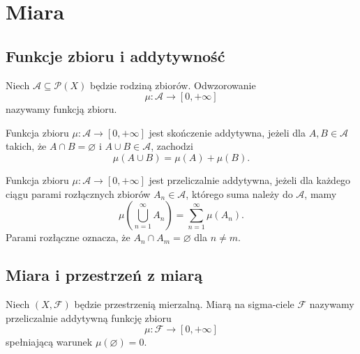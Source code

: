 \chapter{Miara}
\label{chap:miara}

\section{Funkcje zbioru i addytywność}
\label{sec:funkcje-zbioru-addytywnosc}

\begin{definicja}
Niech $\mathcal{A}\subseteq\mathcal{P}(X)$ będzie rodziną zbiorów.
Odwzorowanie
\[
  \mu:\mathcal{A}\longrightarrow[0,+\infty]
\]
nazywamy funkcją zbioru.
\end{definicja}

\begin{definicja}
Funkcja zbioru $\mu:\mathcal{A}\to[0,+\infty]$ jest skończenie
addytywna, jeżeli dla $A,B\in\mathcal{A}$ takich, że
$A\cap B=\varnothing$ i $A\cup B\in\mathcal{A}$, zachodzi
\begin{equation}
  \mu(A\cup B)=\mu(A)+\mu(B).
  \label{eq:skonczona-addytywnosc}
\end{equation}
\end{definicja}

\begin{definicja}
\label{def:przeliczalna-addytywnosc}
Funkcja zbioru $\mu:\mathcal{A}\to[0,+\infty]$ jest przeliczalnie
addytywna, jeżeli dla każdego ciągu parami rozłącznych zbiorów
$A_n\in\mathcal{A}$, którego suma należy do $\mathcal{A}$, mamy
\begin{equation}
  \mu\left(\bigcup_{n=1}^{\infty}A_n\right)
  =\sum_{n=1}^{\infty}\mu(A_n).
  \label{eq:przeliczalna-addytywnosc}
\end{equation}
Parami rozłączne oznacza, że $A_n\cap A_m=\varnothing$ dla $n\neq m$.
\end{definicja}

\section{Miara i przestrzeń z miarą}
\label{sec:miara-przestrzen}

\begin{definicja}[Miara]
\label{def:miara}
Niech $(X,\mathcal{F})$ będzie przestrzenią mierzalną.
Miarą na sigma-ciele $\mathcal{F}$ nazywamy przeliczalnie addytywną
funkcję zbioru
\[
  \mu:\mathcal{F}\longrightarrow[0,+\infty]
\]
spełniającą warunek $\mu(\varnothing)=0$.
\end{definicja}


